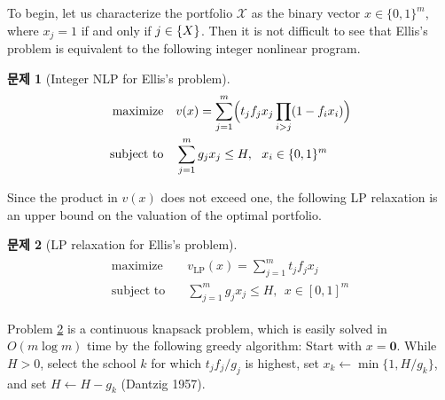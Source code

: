 \documentclass[12pt]{article} %
\theoremstyle{definition}
\newtheorem{problem}{Problem}
\theoremstyle{definition}
\newtheorem{problem}{문제}
\begin{document}
To begin, let us characterize the portfolio $\mathcal{X}$ as the binary vector $x \in \{0, 1\}^m$, where $x_j = 1 $ if and only if $j \in \mathcal\{X\}$. Then it is not difficult to see that Ellis's problem is equivalent to the following integer nonlinear program. 
\begin{problem}[Integer NLP for Ellis's problem] \label{integernlp}
\begin{align}
\begin{split}
\text{maximize}\quad &  v(x) = \sum_{j=1}^m \Bigl( t_j f_j  x_j \prod_{i > j} (1 - f_{i} x_i) \Bigr)\\
\text{subject to}\quad & \sum_{j=1}^m g_j x_j \leq H, ~~ x_i \in \{0, 1\}^m
\end{split}
\end{align}
\end{problem}
Since the product in $v(x)$ does not exceed one, the following LP relaxation is an upper bound on the valuation of the optimal portfolio.
\begin{problem}[LP relaxation for Ellis's problem] \label{LPrelaxation}
\begin{align}
\begin{split}
\text{maximize}\quad &  v_{\mathrm{LP}}(x) = \sum_{j=1}^m  t_j f_j  x_j \\
\text{subject to}\quad & \sum_{j=1}^m g_j x_j \leq H, ~~ x \in [0, 1]^m
\end{split}
\end{align}
\end{problem}
Problem \ref{LPrelaxation} is a continuous knapsack problem, which is easily solved in $O(m \log m)$ time by the following greedy algorithm: Start with $x = \mathbf{0}$. While $H > 0$, select the school $k$ for which $t_j f_j / g_j$ is highest, set $x_k \gets \min\{1, H / g_k\}$, and set $H \gets H - g_k$ (Dantzig 1957).  
\end{document}
